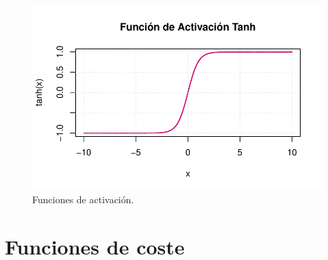 \documentclass[
  us-letterpaper,
]{scrreprt}
\theoremstyle{plain}
\theoremstyle{definition}
\theoremstyle{definition}
\theoremstyle{plain}
\theoremstyle{remark}
\begin{document}
\begin{figure}
\begin{minipage}{0.33\linewidth}
{\includegraphics{redes_files/figure-pdf/fig-fact-5.pdf}

}


\end{minipage}%
%
\begin{minipage}{0.33\linewidth}



\end{minipage}%

\caption{\label{fig-fact}Funciones de activación.}

\end{figure}%

\section{Funciones de coste}\label{funciones-de-coste}
\end{document}
